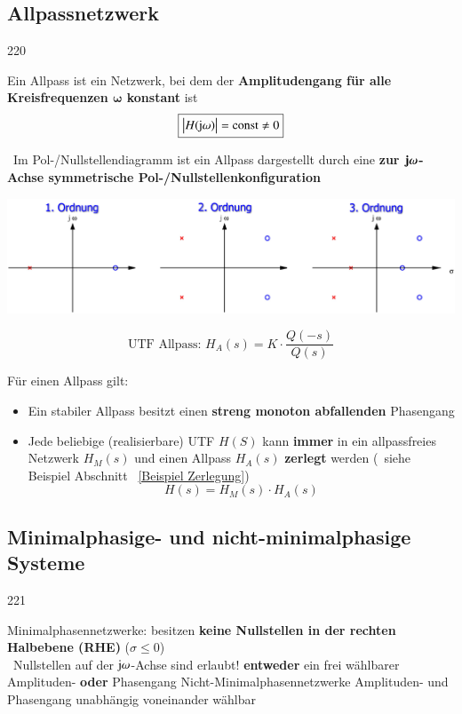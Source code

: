 \subsection{Allpassnetzwerk}{220}

Ein Allpass ist ein Netzwerk, bei dem der \textbf{Amplitudengang für alle Kreisfrequenzen $\bm{\omega}$ konstant} ist
$$ \boxed{\left|H(\mathrm{j} \omega)\right| = \mathrm{const} \neq 0}$$

\textrightarrow\ Im Pol-/Nullstellendiagramm ist ein Allpass dargestellt durch eine 
\textbf{zur $\bm{\mathrm{j} \omega}$-Achse symmetrische Pol-/Nullstellenkonfiguration}

\includegraphics[width=\columnwidth]{images/allpass.png}

$$ \boxed{ \text{UTF Allpass: } H_A(s) = K \cdot \frac{Q(-s)}{Q(s)} } $$

Für einen Allpass gilt:
\begin{itemize}
    \item Ein stabiler Allpass besitzt einen \textbf{streng monoton abfallenden} Phasengang
    \item Jede beliebige (realisierbare) UTF $H(S)$ kann \textbf{immer} in ein allpassfreies Netzwerk $H_M(s)$ und einen Allpass $H_A(s)$
        \textbf{zerlegt} werden (\textrightarrow\ siehe Beispiel Abschnitt ~\ref{Beispiel Zerlegung})
        $$ \boxed{ H(s) = H_M(s) \cdot H_A(s) }$$
\end{itemize}


\subsection{Minimalphasige- und nicht-minimalphasige Systeme}{221}

\begin{outline}
    \1 Minimalphasennetzwerke: 
        \2 besitzen \textbf{keine Nullstellen in der rechten Halbebene (RHE)} ($\sigma \leq 0$) \\
            \textrightarrow\ Nullstellen auf der $\mathrm{j} \omega$-Achse sind erlaubt!
        \2 \textbf{entweder} ein frei wählbarer Amplituden- \textbf{oder} Phasengang
    \1 Nicht-Minimalphasennetzwerke
        \2 Amplituden- und Phasengang unabhängig voneinander wählbar
\end{outline}


